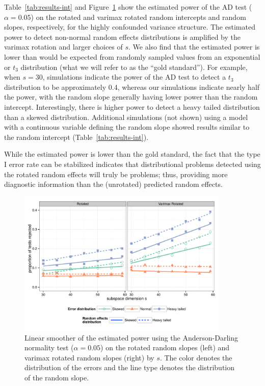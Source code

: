 \documentclass[12pt]{article} %
\newcommand{\hh}[1]{{\color{orange} #1}}
\newcommand{\al}[1]{{\color{red} #1}}
\begin{document}
Table~\ref{tab:results-int} and Figure~\ref{fig:power-slope} show the estimated power of the AD test ($\alpha = 0.05$) on the rotated and varimax rotated random intercepts and random slopes, respectively, for the highly confounded variance structure. The estimated power to detect non-normal random effects distributions is amplified by the varimax rotation and larger choices of $s$. We also find that the estimated power is lower than would be expected from randomly sampled values from an exponential or $t_3$ distribution (what we will refer to as the ``gold standard''). 
For example, when $s=30$, simulations indicate the power of the AD test to detect a $t_3$ distribution to be approximately 0.4, whereas our simulations indicate nearly half the power, with the random slope generally having lower power than the random intercept. Interestingly,  there is higher power to detect a heavy tailed distribution than a skewed distribution.  Additional simulations (not shown) using a model with a continuous variable defining the random slope showed results similar to the random intercept (Table~\ref{tab:results-int}).


While the estimated power is lower than the gold standard, the fact that the type I error rate can be stabilized indicates that distributional problems detected using the rotated random effects will truly be problems; thus, providing more diagnostic information than the (unrotated) predicted random effects.


\begin{figure}
	\centering
	\includegraphics[width=0.9\textwidth]{ad_slope_power.pdf}
	\caption{\label{fig:power-slope}Linear smoother of the estimated power using the Anderson-Darling normality test ($\alpha = 0.05$) on the rotated random slopes (left) and varimax rotated random slopes (right) by $s$. The color denotes the distribution of the errors and the line type denotes the distribution of the random slope.}
\end{figure}
\end{document}

